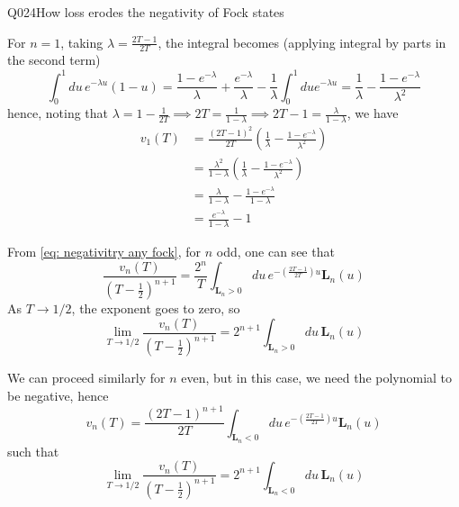 \begin{entry}{Q024}{How loss erodes the negativity of Fock states}
\begin{solution}[Part (a)]
For $n=1$, taking $\lambda=\frac{2T-1}{2T}$, the integral becomes (applying integral by parts in the second term)
\begin{equation}
    \int_{0}^{1} du\, e^{- \lambda u} (1-u)= \frac{1- e^{-\lambda}}{\lambda} + \frac{e^{-\lambda}}{\lambda} - \frac{1}{\lambda} \int_{0}^{1} du e^{- \lambda u} = \frac{1}{\lambda} - \frac{1- e^{-\lambda }}{\lambda^2}  
\end{equation}
hence, noting that $\lambda= 1 -\frac{1}{2T} \implies 2T = \frac{1}{1-\lambda} \implies 2T-1=\frac{\lambda}{1-\lambda}$, we have
\begin{equation}
\begin{split}
    v_1(T) &= \frac{(2T-1)^{2}}{2T} \left( \frac{1}{\lambda} - \frac{1- e^{-\lambda }}{\lambda^2}   \right)\\
    &= \frac{\lambda^{2}}{1-\lambda} \left( \frac{1}{\lambda} - \frac{1- e^{-\lambda }}{\lambda^2}   \right)\\
    &= \frac{\lambda}{1-\lambda} - \frac{1- e^{-\lambda }}{1-\lambda} \\
    &= \frac{e^{-\lambda }}{1-\lambda} - 1
\end{split}
\end{equation}



\end{solution}

\begin{solution}[Part (b)]
From \eqref{eq: negativitry any fock}, for $n$ odd, one can see that 
\begin{equation}
   \frac{v_n(T)}{(T-\frac{1}{2})^{n+1}} = \frac{2^{n}}{T} \int_{\mathbf{L}_n>0} du\, e^{- \left(\frac{2T-1}{2T}\right) u} \mathbf{L}_n\left( u \right)
\end{equation}
As $T\rightarrow 1/2$, the exponent goes to zero, so
\begin{equation}
   \lim_{T\rightarrow 1/2}\frac{v_n(T)}{(T-\frac{1}{2})^{n+1}} = 2^{n+1} \int_{\mathbf{L}_n>0} du\,  \mathbf{L}_n\left( u \right)
\end{equation}

We can proceed similarly for $n$ even, but in this case, we need the polynomial to be negative, hence
\begin{equation}
    v_n(T) =\frac{(2T-1)^{n+1}}{2T} \int_{\mathbf{L}_n<0} du\, e^{- \left(\frac{2T-1}{2T}\right) u} \mathbf{L}_n\left( u \right)
\end{equation}
such that
\begin{equation}
   \lim_{T\rightarrow 1/2}\frac{v_n(T)}{(T-\frac{1}{2})^{n+1}} =2^{n+1} \int_{\mathbf{L}_n<0} du\,  \mathbf{L}_n\left( u \right)
\end{equation}


\end{solution}
\end{entry}
